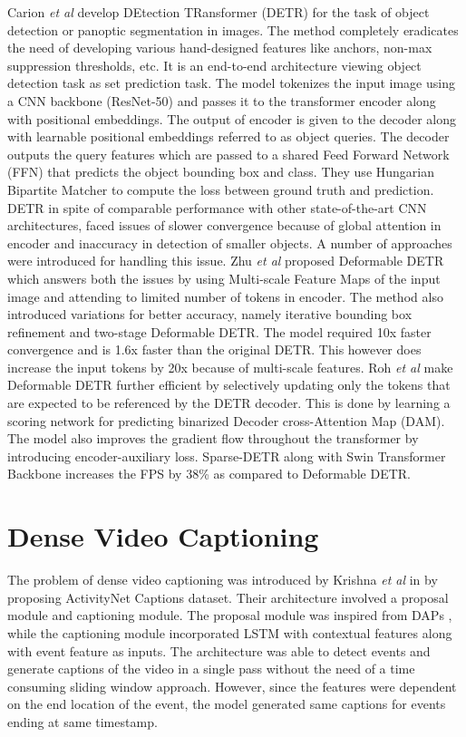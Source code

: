 \par Carion \textit{et al} \cite{carion2020detr} develop DEtection TRansformer (DETR) for the task of object detection or panoptic segmentation in images. The method completely eradicates the need of developing various hand-designed features like anchors, non-max suppression thresholds, etc. It is an end-to-end architecture viewing object detection task as set prediction task. The model tokenizes the input image using a CNN backbone (ResNet-50) and passes it to the transformer encoder along with positional embeddings. The output of encoder is given to the decoder along with learnable positional embeddings referred to as object queries. The decoder outputs the query features which are passed to a shared Feed Forward Network (FFN) that predicts the object bounding box and class. They use Hungarian Bipartite Matcher to compute the loss between ground truth and prediction. DETR in spite of comparable performance with other state-of-the-art CNN architectures, faced issues of slower convergence because of global attention in encoder and inaccuracy in detection of smaller objects. A number of approaches were introduced for handling this issue. Zhu \textit{et al} \cite{zhu2020deformable} proposed Deformable DETR which answers both the issues by using Multi-scale Feature Maps of the input image and attending to limited number of tokens in encoder. The method also introduced variations for better accuracy, namely iterative bounding box refinement and two-stage Deformable DETR. The model required 10x faster convergence and is 1.6x faster than the original DETR. This however does increase the input tokens by 20x because of multi-scale features. Roh \textit{et al} \cite{roh2021sparse} make Deformable DETR further efficient by selectively updating only the tokens that are expected to be referenced by the DETR decoder. This is done by learning a scoring network for predicting binarized Decoder cross-Attention Map (DAM). The model also improves the gradient flow throughout the transformer by introducing encoder-auxiliary loss. Sparse-DETR along with Swin Transformer Backbone increases the FPS by 38\% as compared to Deformable DETR.


\section{Dense Video Captioning}
\par The problem of dense video captioning was introduced by Krishna \textit{et al} in \cite{krishna2017densecaptioning} by proposing ActivityNet Captions dataset. Their architecture involved a proposal module and captioning module. The proposal module was inspired from DAPs \cite{Escorcia2016DAPsDA}, while the captioning module incorporated LSTM with contextual features along with event feature as inputs. The architecture was able to detect events and generate captions of the video in a single pass without the need of a time consuming sliding window approach.  However, since the features were dependent on the end location of the event, the model generated same captions for events ending at same timestamp.

